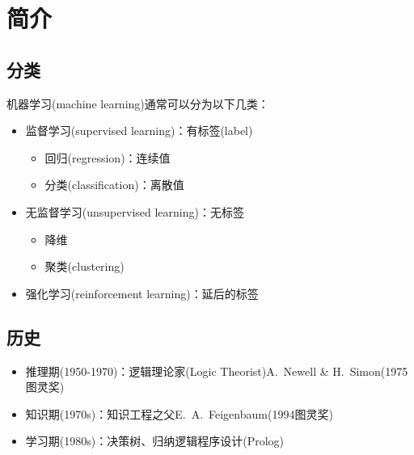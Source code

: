 
\section{简介}
\subsection{分类}
机器学习(machine learning)通常可以分为以下几类：
\begin{itemize}
	\item 监督学习(supervised learning)：有标签(label)
	\begin{itemize}
		\item 回归(regression)：连续值
		\item 分类(classification)：离散值
	\end{itemize}
	\item 无监督学习(unsupervised learning)：无标签
	\begin{itemize}
		\item 降维
		\item 聚类(clustering)
	\end{itemize}
	\item 强化学习(reinforcement learning)：延后的标签
\end{itemize}

\subsection{历史}
\begin{itemize}
	\item 推理期(1950-1970)：逻辑理论家(Logic Theorist)A.~Newell \& H.~Simon(1975图灵奖)
	\item 知识期(1970s)：知识工程之父E.~A.~Feigenbaum(1994图灵奖)
	\item 学习期(1980s)：决策树、归纳逻辑程序设计(Prolog)
\end{itemize}

